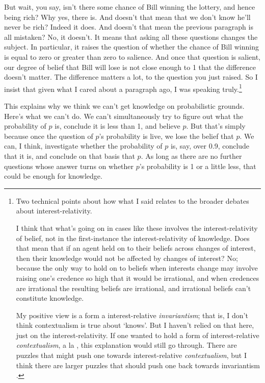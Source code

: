 But wait, you say, isn't there some chance of Bill winning the lottery, and hence being rich? Why yes, there is. And doesn't that mean that we don't know he'll never be rich? Indeed it does. And doesn't that mean the previous paragraph is all mistaken? No, it doesn't. It means that asking all these questions changes the subject. In particular, it raises the question of whether the chance of Bill winning is equal to zero or greater than zero to salience. And once that question is salient, our degree of belief that Bill will lose is not close enough to 1 that the difference doesn't matter. The difference matters a lot, to the question you just raised. So I insist that given what I cared about a paragraph ago, I was speaking truly.\footnote{
Two technical points about how what I said relates to the broader debates about interest-relativity.

I think that what's going on in cases like these involves the interest-relativity of belief, not in the first-instance the interest-relativity of knowledge. Does that mean that if an agent held on to their beliefs across changes of interest, then their knowledge would not be affected by changes of interest? No; because the only way to hold on to beliefs when interests change may involve raising one's credence so high that it would be irrational, and when credences are irrational the resulting beliefs are irrational, and irrational beliefs can't constitute knowledge.

My positive view is a form a interest-relative \textit{invariantism}; that is, I don't think contextualism is true about `knows'. But I haven't relied on that here, just on the interest-relativity. If one wanted to hold a form of interest-relative \textit{contextualism}, a la \citet{FantlMcGrath2009}, this explanation would still go through. There are puzzles that might push one towards interest-relative \textit{contextualism}, but I think there are larger puzzles that should push one back towards invariantism \citep{Weatherson2006-WEAQC}.}

This explains why we think we can't get knowledge on probabilistic grounds. Here's what we can't do. We can't simultaneously try to figure out what the probability of $p$ is, conclude it is less than 1, and believe $p$. But that's simply because once the question of $p$'s probability is live, we lose the belief that $p$. We can, I think, investigate whether the probability of $p$ is, say, over 0.9, conclude that it is, and conclude on that basis that $p$. As long as there are no further questions whose answer turns on whether $p$'s probability is 1 or a little less, that could be enough for knowledge.

